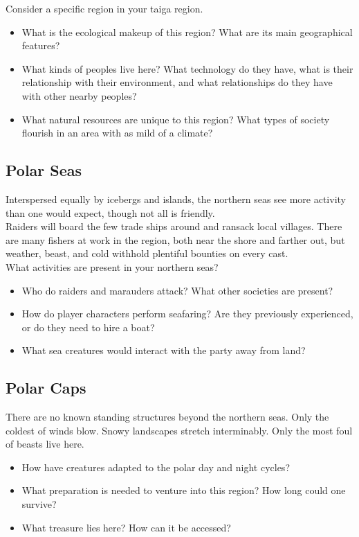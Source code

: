 \documentclass[notitlepage]{article}
\begin{document}
\begin{multicols*}{2}
Consider a specific region in your taiga region.

\begin{itemize}
\item What is the ecological makeup of this region? What are its main geographical features?
\item What kinds of peoples live here? What technology do they have, what is their relationship with their environment, and what relationships do they have with other nearby peoples?
\item What natural resources are unique to this region? What types of society flourish in an area with as mild of a climate?
\end{itemize}

\subsection*{Polar Seas}

Interspersed equally by icebergs and islands, the northern seas see more activity than one would expect, though not all is friendly. \\

Raiders will board the few trade ships around and ransack local villages. There are many fishers at work in the region, both near the shore and farther out, but weather, beast, and cold withhold plentiful bounties on every cast. \\

What activities are present in your northern seas?

\begin{itemize}
\item Who do raiders and marauders attack? What other societies are present?
\item How do player characters perform seafaring? Are they previously experienced, or do they need to hire a boat?
\item What sea creatures would interact with the party away from land?
\end{itemize}

\subsection*{Polar Caps}

There are no known standing structures beyond the northern seas. Only the coldest of winds blow. Snowy landscapes stretch interminably. Only the most foul of beasts live here.

\begin{itemize}
\item How have creatures adapted to the polar day and night cycles?
\item What preparation is needed to venture into this region? How long could one survive?
\item What treasure lies here? How can it be accessed?
\end{itemize}


\end{multicols*}
\end{document}
